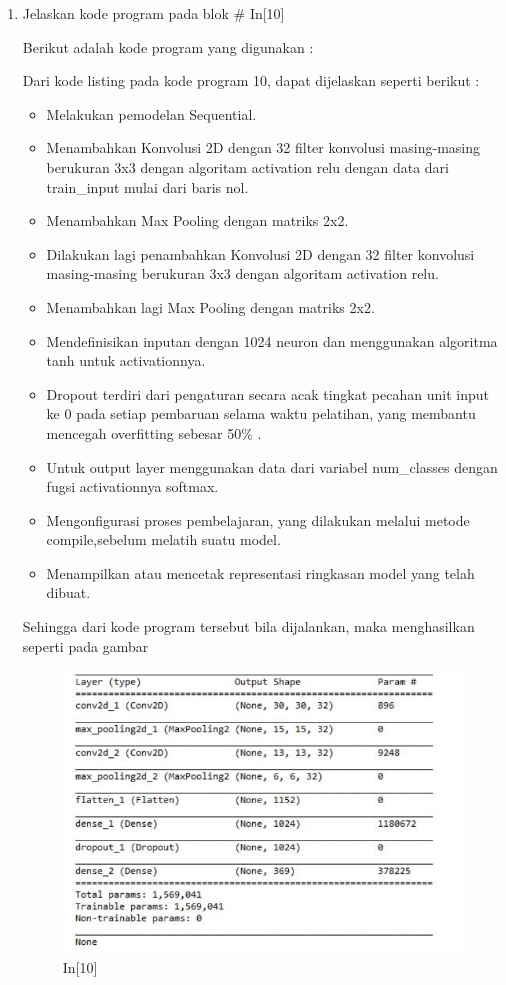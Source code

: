 \begin{enumerate}
\begin{figure}[!htbp]
\end{figure}
\item Jelaskan kode program pada blok \# In[10]
\par Berikut adalah kode program yang digunakan :

\par Dari kode listing pada kode program 10, dapat dijelaskan seperti berikut :
\begin{itemize}
\item Melakukan pemodelan Sequential.
\item Menambahkan Konvolusi 2D dengan 32 filter konvolusi masing-masing berukuran 3x3 dengan algoritam activation relu dengan data dari train\_input mulai dari baris nol.
\item Menambahkan Max Pooling dengan matriks 2x2.
\item Dilakukan lagi penambahkan Konvolusi 2D dengan 32 filter konvolusi masing-masing berukuran 3x3 dengan algoritam activation relu.
\item Menambahkan lagi Max Pooling dengan matriks 2x2.
\item Mendefinisikan inputan dengan 1024 neuron dan menggunakan algoritma tanh untuk activationnya.
\item Dropout terdiri dari pengaturan secara acak tingkat pecahan unit input ke 0 pada setiap pembaruan selama waktu pelatihan, yang membantu mencegah overfitting sebesar 50\% .
\item Untuk output layer menggunakan data dari variabel num\_classes dengan fugsi activationnya softmax.
\item Mengonfigurasi proses pembelajaran, yang dilakukan melalui metode compile,sebelum melatih suatu model.
\item Menampilkan atau mencetak representasi ringkasan model yang telah dibuat.
\end{itemize}
\par Sehingga dari kode program tersebut bila dijalankan, maka menghasilkan seperti pada gambar 
\begin{figure}[!htbp]
	\centerline{\includegraphics[width=1\textwidth]{figures/andi/p10.PNG}}
	\caption{In[10]}
\end{figure}


\end{enumerate}

